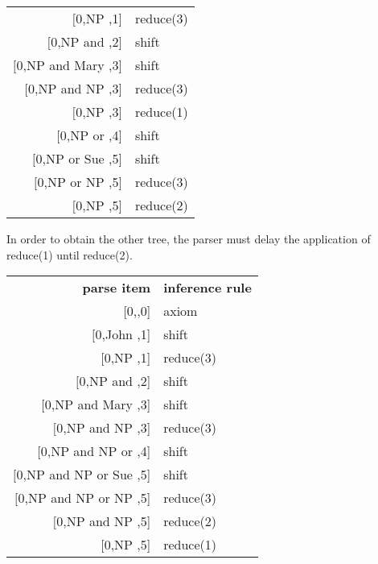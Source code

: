 \begin{examplebox}
\begin{center}
\begin{tabular}{r|l}
            $\lbrack$0,NP \psep,1]          & reduce(3)\\
            $\lbrack$0,NP and \psep,2]      & shift\\
            $\lbrack$0,NP and Mary \psep,3] & shift\\
            $\lbrack$0,NP and NP \psep,3]   & reduce(3)\\
            $\lbrack$0,NP \psep,3]          & reduce(1)\\
            $\lbrack$0,NP or \psep,4]       & shift\\
            $\lbrack$0,NP or Sue \psep,5]   & shift\\
            $\lbrack$0,NP or NP \psep,5]    & reduce(3)\\
            $\lbrack$0,NP \psep,5]          & reduce(2)
        \end{tabular}
    \end{center}
    In order to obtain the other tree, the parser must delay the application of reduce(1) until reduce(2).
    \begin{center}
        \begin{tabular}{r|l}
            \textbf{parse item}                  & \textbf{inference rule}\\
            $\lbrack$0,\psep,0]                  & axiom\\
            $\lbrack$0,John \psep,1]             & shift\\
            $\lbrack$0,NP \psep,1]               & reduce(3)\\
            $\lbrack$0,NP and \psep,2]           & shift\\
            $\lbrack$0,NP and Mary \psep,3]      & shift\\
            $\lbrack$0,NP and NP \psep,3]        & reduce(3)\\
            $\lbrack$0,NP and NP or \psep,4]     & shift\\
            $\lbrack$0,NP and NP or Sue \psep,5] & shift\\
            $\lbrack$0,NP and NP or NP \psep,5]  & reduce(3)\\
            $\lbrack$0,NP and NP \psep,5]        & reduce(2)\\
            $\lbrack$0,NP \psep,5]               & reduce(1)
        \end{tabular}
    \end{center}
\end{examplebox}

